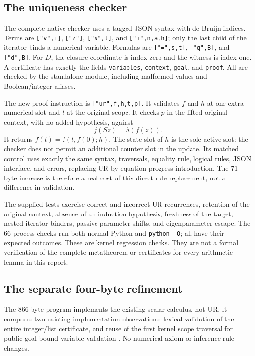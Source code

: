\documentclass[11pt]{article}
\theoremstyle{definition}\newtheorem{definition}[theorem]{Definition}
\begin{document}
\subsection{The uniqueness checker}
The complete native checker uses a tagged JSON syntax with de Bruijn
indices.  Terms are \texttt{["v",i]}, \texttt{["z"]},
\texttt{["s",t]}, and \texttt{["i",n,a,h]}; only the last child of
the iterator binds a numerical variable.  Formulas are
\texttt{["=",s,t]}, \texttt{["q",B]}, and \texttt{["d",B]}.
For $D$, the closure coordinate is index zero and the witness is index one.
A certificate has exactly the fields \texttt{variables}, \texttt{context},
\texttt{goal}, and \texttt{proof}.  All are checked by the standalone
module, including malformed values and Boolean/integer aliases.

The new proof instruction is
\texttt{["ur",f,h,t,p]}.  It validates $f$ and $h$ at one extra numerical
slot and $t$ at the original scope.  It checks $p$ in the lifted original
context, with no added hypothesis, against
\[
 f(Sz)=h(f(z)).
\]
It returns $f(t)=I(t,f(0);h)$.  The state slot of $h$ is the sole active
slot; the checker does not permit an additional counter slot in the
update.  Its matched control uses exactly the same syntax, traversals,
equality rule, logical rules, JSON interface, and errors, replacing UR
by equation-progress introduction.  The 71-byte increase is therefore a
real cost of this direct rule replacement, not a difference in validation.

The supplied tests exercise correct and incorrect UR recurrences, retention
of the original context, absence of an induction hypothesis, freshness
of the target, nested iterator binders, passive-parameter shifts, and
eigenparameter escape.  The 66 process checks run both normal Python and
\texttt{python -O}; all have their expected outcomes.  These are kernel
regression checks.  They are not a formal verification of the complete
metatheorem or certificates for every arithmetic lemma in this report.

\subsection{The separate four-byte refinement}
The 866-byte program implements the existing scalar calculus, not UR.
It composes two existing implementation observations: lexical validation
of the entire integer/list certificate, and reuse of the first kernel
scope traversal for public-goal bound-variable validation
\cite{validated,scope}.  No numerical axiom or inference rule changes.
\end{document}
